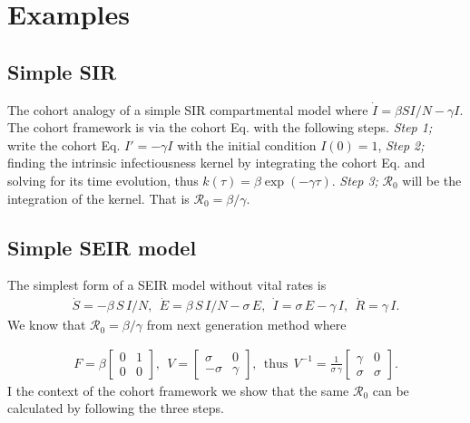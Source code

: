 \documentclass[12pt]{article}
\newcommand{\R}{\ensuremath{\mathcal{R}_0}}
\theoremstyle{definition} %
\begin{document}
\section{Examples}

\subsection {Simple SIR}
The cohort analogy of a simple SIR compartmental model where $\dot I=\beta S I/N-\gamma I$. The cohort framework is via the cohort Eq. with the following steps.
{\it Step 1;} write the cohort Eq. $I'=-\gamma I$ with the initial condition $I(0)=1$, 
{\it Step 2;} finding the intrinsic infectiousness kernel by integrating the cohort Eq. and solving for its time evolution, thus $k(\tau)=\beta \exp(-\gamma \tau)$.
{\it Step 3;} $\R$ will be the integration of the kernel. That is $\R=\beta/\gamma$. 

\subsection{Simple SEIR model}
The simplest form of a SEIR model without vital rates is 
\begin{align}\label{mo:sier1}
\dot S=-\beta\,S\,I/N,~~
\dot E= \beta\,S\,I/N -\sigma\,E,~~
\dot I= \sigma\,E -\gamma\,I,~~
\dot R= \gamma\,I.
\end{align}
We know that $\R=\beta/\gamma$ from next generation method where 

\begin{align}
\label{seir1FV}
F = \beta \left[ \begin {array}{cc} 
0 & 1 \\
0 & 0
 \end {array} \right],~~
V=
 \left[ \begin {array}{cc}
 \sigma & 0 \\
-\sigma & \gamma
\end {array} \right],
~~ \text{thus}~~
V^{-1} = \frac{1}{\sigma\,\gamma}
\left[ \begin {array}{cc}
\gamma & 0 \\
\sigma & \sigma
\end {array} \right].
\end{align}
I the context of the cohort framework we show that the same $\R$ can be calculated by following the three steps.
\end{document}

